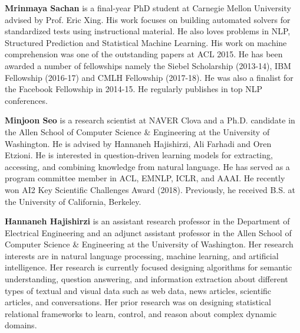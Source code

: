 \begin{bio}

\textbf{Mrinmaya Sachan} is a final-year PhD student at
Carnegie Mellon University advised by Prof. Eric
Xing. His work focuses on building automated
solvers for standardized tests using instructional
material. He also loves problems in NLP, Structured
Prediction and Statistical Machine Learning.
His work on machine comprehension was
one of the outstanding papers at ACL 2015. He
has been awarded a number of fellowships namely
the Siebel Scholarship (2013-14), IBM Fellowship
(2016-17) and CMLH Fellowship (2017-18).
He was also a finalist for the Facebook Fellowship
in 2014-15. He regularly publishes in top
NLP conferences. 

\textbf{Minjoon Seo} is a research scientist at NAVER
Clova and a Ph.D. candidate in the Allen School
of Computer Science & Engineering at the University
of Washington. He is advised by Hannaneh
Hajishirzi, Ali Farhadi and Oren Etzioni. He is
interested in question-driven learning models for
extracting, accessing, and combining knowledge
from natural language. He has served as a program
committee member in ACL, EMNLP, ICLR, and
AAAI. He recently won AI2 Key Scientific Challenges
Award (2018). Previously, he received B.S.
at the University of California, Berkeley. 

\textbf{Hannaneh Hajishirzi} is an assistant research professor
in the Department of Electrical Engineering
and an adjunct assistant professor in the Allen
School of Computer Science & Engineering at the
University of Washington. Her research interests
are in natural language processing, machine learning,
and artificial intelligence. Her research is currently
focused designing algorithms for semantic
understanding, question answering, and information
extraction about different types of textual and
visual data such as web data, news articles, scientific
articles, and conversations. Her prior research
was on designing statistical relational frameworks
to learn, control, and reason about complex dynamic
domains. 


\end{bio}
